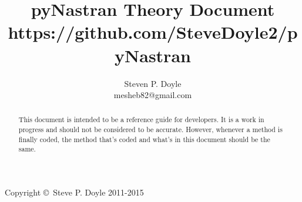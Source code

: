 \documentclass[a4paper,12pt]{article}
\begin{document}
\title{pyNastran Theory Document \\
\small https://github.com/SteveDoyle2/pyNastran }
\author{Steven P. Doyle\\
{\small mesheb82@gmail.com}
}

\maketitle

\begin{abstract}
This document is intended to be a reference guide for developers.  It is a work in progress and should not be considered to be accurate.  However, whenever a method is finally coded, the method that's coded and what's in this document should be the same.
\end{abstract}

Copyright \copyright\ Steve P. Doyle 2011-2015
\newpage

\tableofcontents
\newpage


\newpage








%
%
\end{document}
